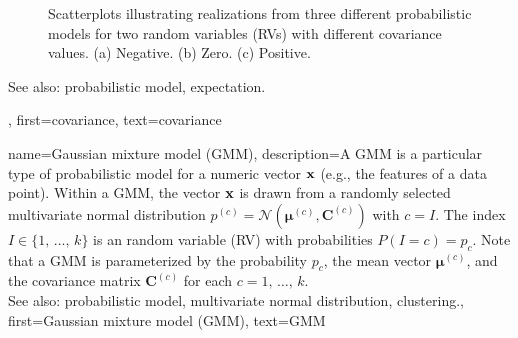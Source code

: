 {{{\begin{figure}[H]
			\caption{Scatterplots illustrating realizations from three different probabilistic models for two 
				random variables (RVs) with different covariance values. (a) Negative. (b) Zero. (c) Positive.}
			\label{fig:covariance-examples_dict}
		\end{figure}
		See also: probabilistic model, expectation. },
	first={covariance},
	text={covariance} 
}

{name={Gaussian mixture model (GMM)}, 
	description={A GMM 
		is a particular type of probabilistic model for a numeric vector ${\bf x}$ (e.g., 
		the features of a data point). Within a GMM, the vector ${\bf x}$ 
		is drawn from a randomly selected multivariate normal distribution 
		$p^{(c)} = \mathcal{N}\left({\bm \mu}^{(c)},\mathbf{C}^{(c)}\right)$ with 
		$c = I$. The index $I \in \{1, \,\ldots, \,k\}$ is an random variable (RV) with 
		probabilities $P\left(I=c\right) = p_{c}$.
	     	Note that a GMM is parameterized by the probability $p_{c}$, the 
		mean vector ${\bm \mu}^{(c)}$, and the covariance matrix $\mathbf{C}^{(c)}$ 
		for each $c=1, \,\ldots, \,k$. 
				\\
		See also: probabilistic model, multivariate normal distribution, clustering.},
	first={Gaussian mixture model (GMM)},
	text={GMM} 
}
 
}
